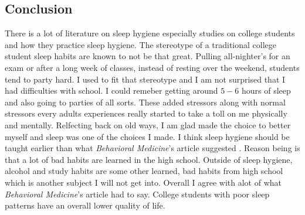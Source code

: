 \documentclass[a4paper,man,biblatex]{apa6}
\begin{document}
\subsection{Conclusion} There is a lot of literature on sleep hygiene especially studies on college students and how they practice sleep hygiene. The stereotype of a traditional college student sleep habits are known to not be that great. Pulling all-nighter's for an exam or after a long week of classes, instead of resting over the weekend, students tend to party hard. I used to fit that stereotype and I am not surprised that I had difficulties with school. I could remeber getting around $5-6$ hours of sleep and also going to parties of all sorts. These added stressors along with normal stressors every adults experiences really started to take a toll on me physically and mentally. Relfecting back on old ways, I am glad made the choice to better myself and sleep was one of the choices I made. I think sleep hygiene should be taught earlier than what \textit{Behavioral Medicine}'s article suggested \autocite{sleep101}. Reason being is that a lot of bad habits are learned in the high school. Outside of sleep hygiene, alcohol and study habits are some other learned, bad habits from high school which is another subject I will not get into. Overall I agree with alot of what \textit{Behavioral Medicine}'s article had to say. College students with poor sleep patterns have an overall lower quality of life.

\printbibliography
\end{document}
